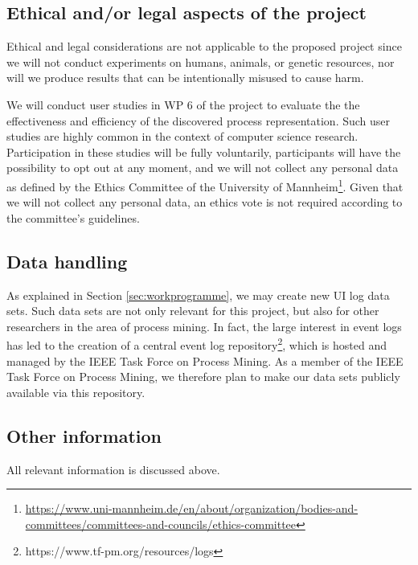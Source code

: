 
 \subsection{Ethical and/or legal aspects of the project}
 
Ethical and legal considerations are not applicable to the proposed project since we 
will not conduct experiments on humans, animals, or genetic resources, nor will we  produce results that can be intentionally misused to cause harm. 

We will conduct user studies in WP 6 of the project to evaluate the the effectiveness and efficiency of the discovered process representation. Such user studies are highly common in the context of computer science research. Participation in these studies will be fully voluntarily, participants will have the possibility to opt out at any moment, and we will not collect any personal data as defined by the Ethics Committee of the University of Mannheim\footnote{\url{https://www.uni-mannheim.de/en/about/organization/bodies-and-committees/committees-and-councils/ethics-committee}}. Given that we will not collect any personal data, an ethics vote is not required according to the committee's guidelines. 

\subsection{Data handling}

As explained in Section \ref{sec:workprogramme}, we may create new UI log data sets. Such data sets are not only relevant for this project, but also for other researchers in the area of process mining. In fact, the large interest in event logs has led to the creation of a central event log repository\footnote{https://www.tf-pm.org/resources/logs}, which is hosted and managed by the IEEE Task Force on Process Mining. As a member of the IEEE Task Force on Process Mining, we therefore plan to make our data sets publicly available via this repository. 

\subsection{Other information}

All relevant information is discussed above. 